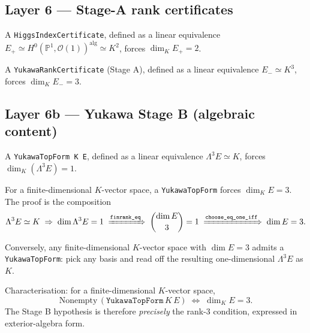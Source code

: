 \documentclass[11pt,a4paper]{article}
\begin{document}
\subsection*{Layer 6 --- Stage-A rank certificates}

\begin{theorem}
A \texttt{HiggsIndexCertificate}, defined as a linear equivalence
$E_+ \simeq H^0(\mathbb P^1, \mathcal O(1))^{\mathrm{alg}}
\simeq K^2$, forces $\dim_K E_+ = 2$.
\end{theorem}

\begin{theorem}
A \texttt{YukawaRankCertificate} (Stage A), defined as a linear
equivalence $E_- \simeq K^3$, forces $\dim_K E_- = 3$.
\end{theorem}

\subsection*{Layer 6b --- Yukawa Stage B (algebraic content)}

\begin{theorem}
A \texttt{YukawaTopForm K E}, defined as a linear equivalence
$\Lambda^3 E \simeq K$, forces $\dim_K (\Lambda^3 E) = 1$.
\end{theorem}

\begin{theorem}
For a finite-dimensional $K$-vector space, a \texttt{YukawaTopForm}
forces $\dim_K E = 3$. The proof is the composition
\[
\Lambda^3 E \simeq K
\;\Rightarrow\; \dim \Lambda^3 E = 1
\;\xRightarrow{\text{\texttt{finrank\_eq}}}\; \binom{\dim E}{3} = 1
\;\xRightarrow{\text{\texttt{choose\_eq\_one\_iff}}}\; \dim E = 3.
\]
\end{theorem}

\begin{theorem}
Conversely, any finite-dimensional $K$-vector space with $\dim E = 3$
admits a \texttt{YukawaTopForm}: pick any basis and read off the
resulting one-dimensional $\Lambda^3 E$ as $K$.
\end{theorem}

\begin{theorem}
Characterisation: for a finite-dimensional $K$-vector space,
\[
\text{Nonempty}\,(\texttt{YukawaTopForm}\,K\,E)
\;\iff\;
\dim_K E = 3.
\]
The Stage B hypothesis is therefore \emph{precisely} the rank-3
condition, expressed in exterior-algebra form.
\end{theorem}
\end{document}
